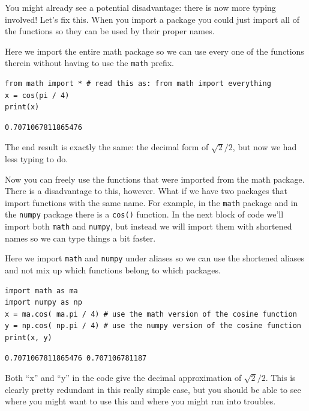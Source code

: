 You might already see a potential disadvantage: there is now more typing involved! Let's
fix this.  When you import a package you could just import all of the functions so they
can be used by their proper names.

\begin{example}
    Here we import the entire math package so we can use every one of the functions
    therein without having to use the \texttt{math} prefix.

    \bcode
\begin{lstlisting}
from math import * # read this as: from math import everything
x = cos(pi / 4)
print(x)
\end{lstlisting}
\boutput
\begin{lstlisting}
0.7071067811865476
\end{lstlisting}
The end result is exactly the same: the decimal form of $\sqrt{2}/2$, but now we had less
typing to do.
\end{example}

Now you can freely use the functions that were imported from the math package. There is a
disadvantage to this, however. What if we have two packages that import functions with the
same name. For example, in the \texttt{math} package and in the \texttt{numpy} package
there is a \texttt{cos()} function. In the next block of code we'll import both
\texttt{math} and \texttt{numpy}, but instead we will import them with shortened names so
we can type things a bit faster.

\begin{example}
    Here we import \texttt{math} and \texttt{numpy} under aliases so we can use the
    shortened aliases and not mix up which functions belong to which packages.

    \bcode
\begin{lstlisting}
import math as ma
import numpy as np
x = ma.cos( ma.pi / 4) # use the math version of the cosine function
y = np.cos( np.pi / 4) # use the numpy version of the cosine function
print(x, y)
\end{lstlisting}
\boutput
\begin{lstlisting}
0.7071067811865476 0.707106781187
\end{lstlisting}
Both ``x'' and ``y'' in the code give the decimal approximation of $\sqrt{2}/2$.  This is
clearly pretty redundant in this really simple case, but you should be able to see where
you might want to use this and where you might run into troubles.
\end{example}


